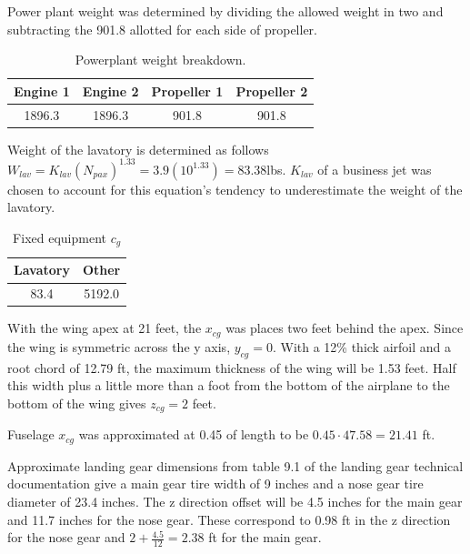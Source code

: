 \documentclass[conf]{new-aiaa}
\begin{document}
Power plant weight was determined by dividing the allowed weight in two and subtracting the 901.8 allotted for each side of propeller.

\begin{table}[H]
\centering
\label{tab:Powerplant Weight}
\caption{Powerplant weight breakdown.}
\begin{tabular}{|c|c|c|c|}\hline
Engine 1 & Engine 2 & Propeller 1 & Propeller 2 \\ \hline
1896.3 & 1896.3 & 901.8 & 901.8 \\ \hline
\end{tabular}
\end{table}

Weight of the lavatory is determined as follows $W_{lav} = K_{lav}(N_{pax})^1.33=3.9(10^{1.33})=83.38$lbs\cite{pres19}. $K_{lav}$ of a business jet was chosen to account for this equation's tendency to underestimate the weight of the lavatory.

\begin{table}[H]
\centering
\label{tab:Fixed Equipment Weight}
\caption{Fixed equipment $c_g$}
\begin{tabular}{|c|c|}\hline
Lavatory & Other \\ \hline
83.4 & 5192.0 \\ \hline
\end{tabular}
\end{table}

With the wing apex at 21 feet, the $x_{cg}$ was places two feet behind the apex. Since the wing is symmetric across the y axis, $y_{cg}=0$. With a 12\% thick airfoil and a root chord of 12.79 ft, the maximum thickness of the wing will be 1.53 feet. Half this width plus a little more than a foot from the bottom of the airplane to the bottom of the wing gives $z_{cg}=2$ feet.

Fuselage $x_{cg}$ was approximated at 0.45 of length\cite{pres19} to be $0.45\cdot47.58=21.41$ ft.

Approximate landing gear dimensions from table 9.1 of the landing gear technical documentation\citet{orange_book} give a main gear tire width of 9 inches and a nose gear tire diameter of 23.4 inches. The z direction offset will be 4.5 inches for the main gear and 11.7 inches for the nose gear. These correspond to 0.98 ft in the z direction for the nose gear and $2+\frac{4.5}{12}=2.38$ ft for the main gear.
\end{document}
